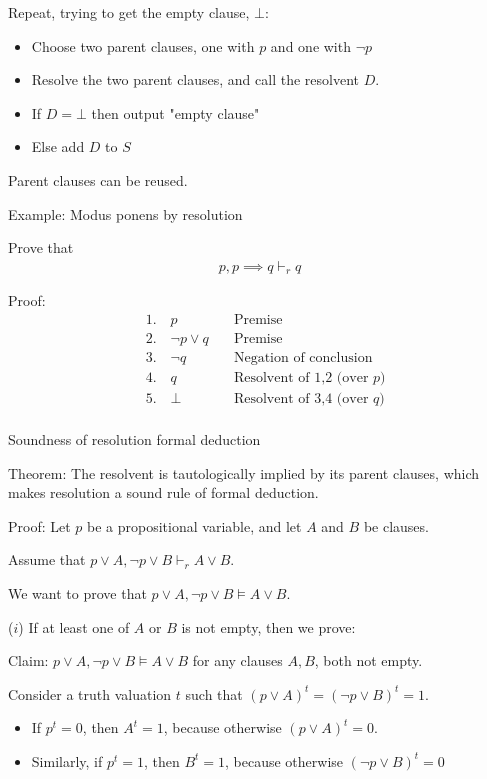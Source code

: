 \documentclass{article}
\begin{document}
Repeat, trying to get the empty clause, $\bot$:
\begin{itemize}
    \item Choose two parent clauses, one with $p$ and one with $\neg p$ 
    \item Resolve the two parent clauses, and call the resolvent $D$.
    \item If $D = \bot$ then output "empty clause"
    \item Else add $D$ to $S$
\end{itemize}

Parent clauses can be reused.

Example: Modus ponens by resolution

Prove that
\begin{align*}
p, p \implies q \vdash_r q
\end{align*}

Proof:
\begin{align*}
&1. \quad  p \quad &\text{Premise} \\
&2. \quad \neg p \vee q \quad &\text{Premise}\\
&3. \quad \neg q \quad &\text{Negation of conclusion}\\
&4. \quad q \quad &\text{Resolvent of 1,2 (over } p)\\
&5. \quad  \bot \quad &\text{Resolvent of 3,4 (over } q)\\
\end{align*}

Soundness of resolution formal deduction

Theorem: The resolvent is tautologically implied by its parent clauses, which makes resolution a sound rule of formal deduction.

Proof: Let $p$ be a propositional variable, and let $A$ and $B$ be clauses.

Assume that $p \vee A, \neg p \vee B \vdash_r A \vee B$.

We want to prove that $p \vee A, \neg p \vee B \vDash A \vee B$.

($i$) If at least one of $A$ or $B$ is not empty, then we prove:

Claim: $p \vee A, \neg p \vee B \vDash A \vee B$ for any clauses $A,B$, both not empty.

Consider a truth valuation $t$ such that $(p \vee A)^t = (\neg p \vee B)^t = 1.$
\begin{itemize}
    \item If $p^t = 0$, then $A^t = 1$, because otherwise $(p \vee A)^t = 0$.
    \item Similarly, if $p^t = 1$, then $B^t = 1$, because otherwise $(\neg p \vee B)^t = 0$
\end{itemize}
\end{document}
